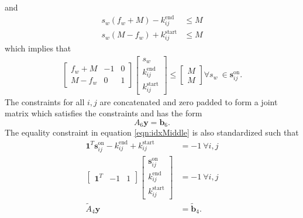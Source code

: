 and
\begin{equation}\begin{aligned}
	s_w\left (f_w + M \right) - k_{ij}^{\text{end}} &\le M \\
	s_w\left (M - f_w\right) + k_{ij}^{\text{start}} &\le M 
\end{aligned}\end{equation}
which implies that
\begin{equation} \begin{aligned}
	\begin{bmatrix}f_w + M & -1 & 0\\
		       M - f_w & 0 & 1 
	\end{bmatrix} 
	\begin{bmatrix}s_w                 \\
		       k_{ij}^{\text{end}} \\ 
		       k_{ij}^{\text{start}}
	\end{bmatrix} \le
	\begin{bmatrix} M \\
	                M 
	\end{bmatrix} \forall s_w \ \in \mathbf{s}_{ij}^{\text{on}}.
\end{aligned}\end{equation}
The constraints for all $i,j$ are concatenated and zero padded to form a joint matrix which satisfies the constraints and has the form 
\begin{equation}
	A_6\mathbf{y} = \mathbf{b}_6.
\end{equation}
The equality constraint in equation \ref{eqn:idxMiddle} is also standardized such that
\begin{equation} \begin{aligned}
	\mathbf{1}^T\mathbf{s}_{ij}^{\text{on}} - k_{ij}^{\text{end}} + k_{ij}^{\text{start}} &= -1 \ \forall i,j\\
	\begin{bmatrix}\mathbf{1}^T & -1 & 1\end{bmatrix} \begin{bmatrix}\mathbf{s}_{ij}^{\text{on}} \\ k_{ij}^{\text{end}} \\ k_{ij}^{\text{start}} \end{bmatrix} &= -1 \ \forall i,j \\
		\tilde{A}_4\mathbf{y} &= \tilde{\mathbf{b}}_4.
\end{aligned} \end{equation}

